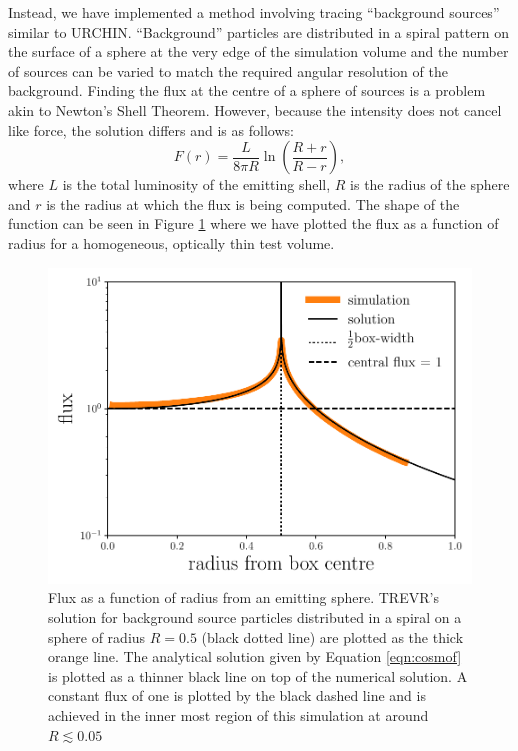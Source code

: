 \documentclass[fleq,usenatbib]{mnras}
\newcommand{\acro}{TREVR}
\begin{document}
{Instead, we have implemented a method involving tracing ``background sources'' 
similar to URCHIN. ``Background'' particles are distributed in a spiral 
pattern on the surface of a sphere at the very edge of the simulation volume 
and the number of sources can be varied 
to match the required angular resolution of the background. Finding the flux 
at the centre of a sphere of sources is a problem akin to Newton's Shell 
Theorem. However, because the intensity does not cancel like force, the 
solution differs and is as follows:
\begin{equation}
\label{eqn:cosmof}
F(r) = \frac{L}{8\pi R} \ln \left(\frac{R+r}{R-r}\right),
\end{equation}
where $L$ is the total luminosity of the emitting shell, $R$ is the radius of 
the sphere and $r$ is the radius at which the flux is being computed. The 
shape of the function can be seen in Figure \ref{fig:cosmof} where we have 
plotted the flux as a function of radius for a homogeneous, optically thin 
test volume.
\begin{figure}
\includegraphics[width=1\linewidth]{Figures/cosmofield.pdf}
\caption{Flux as a function of radius from an emitting sphere. \acro{}'s 
solution for background source particles distributed in a spiral on a sphere 
of radius $R=0.5$ (black dotted line) are plotted as the thick orange line. 
The analytical solution given by Equation \ref{eqn:cosmof} is plotted as a 
thinner black line on top of the numerical solution. A constant flux of one is 
plotted by the black dashed line and is achieved in the inner most region of 
this simulation at around $R \lesssim 0.05$}
\label{fig:cosmof}
\end{figure}

}
\end{document}
